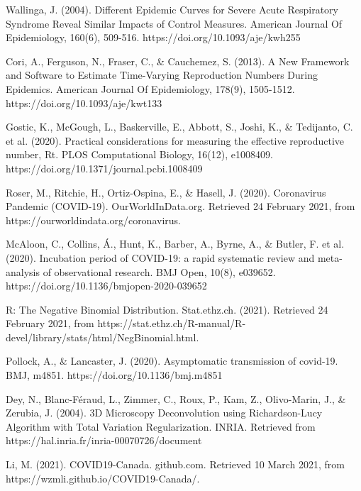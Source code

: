 \documentclass{article}
\begin{document}
\begin{thebibliography}{2}

Wallinga, J. (2004). Different Epidemic Curves for Severe Acute Respiratory Syndrome Reveal Similar Impacts of Control Measures. American Journal Of Epidemiology, 160(6), 509-516. https://doi.org/10.1093/aje/kwh255

Cori, A., Ferguson, N., Fraser, C., \& Cauchemez, S. (2013). A New Framework and Software to Estimate Time-Varying Reproduction Numbers During Epidemics. American Journal Of Epidemiology, 178(9), 1505-1512. https://doi.org/10.1093/aje/kwt133

Gostic, K., McGough, L., Baskerville, E., Abbott, S., Joshi, K., \& Tedijanto, C. et al. (2020). Practical considerations for measuring the effective reproductive number, Rt. PLOS Computational Biology, 16(12), e1008409. https://doi.org/10.1371/journal.pcbi.1008409


Roser, M., Ritchie, H., Ortiz-Ospina, E., \& Hasell, J. (2020). Coronavirus Pandemic (COVID-19). OurWorldInData.org. Retrieved 24 February 2021, from https://ourworldindata.org/coronavirus.

McAloon, C., Collins, Á., Hunt, K., Barber, A., Byrne, A., \& Butler, F. et al. (2020). Incubation period of COVID-19: a rapid systematic review and meta-analysis of observational research. BMJ Open, 10(8), e039652. https://doi.org/10.1136/bmjopen-2020-039652

R: The Negative Binomial Distribution. Stat.ethz.ch. (2021). Retrieved 24 February 2021, from https://stat.ethz.ch/R-manual/R-devel/library/stats/html/NegBinomial.html.

Pollock, A., \& Lancaster, J. (2020). Asymptomatic transmission of covid-19. BMJ, m4851. https://doi.org/10.1136/bmj.m4851

Dey, N., Blanc-Féraud, L., Zimmer, C., Roux, P., Kam, Z., Olivo-Marin, J., \& Zerubia, J. (2004). 3D Microscopy Deconvolution using Richardson-Lucy Algorithm with Total Variation Regularization. INRIA. Retrieved from https://hal.inria.fr/inria-00070726/document

Li, M. (2021). COVID19-Canada. github.com. Retrieved 10 March 2021, from https://wzmli.github.io/COVID19-Canada/.
    


\end{thebibliography}
\end{document}
